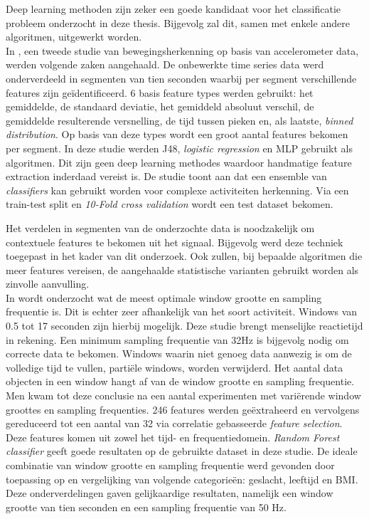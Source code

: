 Deep learning methoden zijn zeker een goede kandidaat voor het classificatie probleem onderzocht in deze thesis. Bijgevolg zal dit, samen met enkele andere algoritmen, uitgewerkt worden.\\

In \citep{ref6}, een tweede studie van bewegingsherkenning op basis van accelerometer data, werden volgende zaken aangehaald. De onbewerkte time series data werd onderverdeeld in segmenten van tien seconden waarbij per segment verschillende features zijn geïdentificeerd. 6 basis feature types werden gebruikt: het gemiddelde, de standaard deviatie, het gemiddeld absoluut verschil, de gemiddelde resulterende versnelling, de tijd tussen pieken en, als laatste,  \textit{binned distribution}. Op basis van deze types wordt een groot aantal features bekomen per segment.
In deze studie werden J48, \textit{logistic regression} en MLP gebruikt als algoritmen. Dit zijn geen deep learning methodes waardoor handmatige feature extraction inderdaad vereist is.
De studie toont aan dat een ensemble van \textit{classifiers} kan gebruikt worden voor complexe activiteiten herkenning. 
Via een train-test split en \textit{10-Fold cross validation} wordt een test dataset bekomen. 

Het verdelen in segmenten van de onderzochte data is noodzakelijk om contextuele features te bekomen uit het signaal. Bijgevolg werd deze techniek toegepast in het kader van dit onderzoek. Ook zullen, bij bepaalde algoritmen die meer features vereisen, de aangehaalde statistische varianten gebruikt worden als zinvolle aanvulling. \\

In \citep{ref13} wordt onderzocht wat de meest optimale window grootte en sampling frequentie is. Dit is echter zeer afhankelijk van het soort activiteit. Windows van 0.5 tot 17 seconden zijn hierbij mogelijk. Deze studie brengt menselijke reactietijd in rekening. Een minimum sampling frequentie van 32Hz is bijgevolg nodig om correcte data te bekomen.
Windows waarin niet genoeg data aanwezig is om de volledige tijd te vullen, partiële windows, worden verwijderd.
Het aantal data objecten in een window hangt af van de window grootte en sampling frequentie. Men kwam tot deze conclusie na een aantal experimenten met variërende window groottes en sampling frequenties.
246 features werden geëxtraheerd en vervolgens gereduceerd tot een aantal van 32 via correlatie gebasseerde \textit{feature selection}. Deze features komen uit zowel het tijd- en frequentiedomein. 
\textit{Random Forest classifier} geeft goede resultaten op de gebruikte dataset in deze studie. 
De ideale combinatie van window grootte en sampling frequentie werd gevonden door toepassing op en vergelijking van volgende categorieën: geslacht, leeftijd en BMI. Deze onderverdelingen gaven gelijkaardige resultaten, namelijk een window grootte van tien seconden en een sampling frequentie van 50 Hz.

